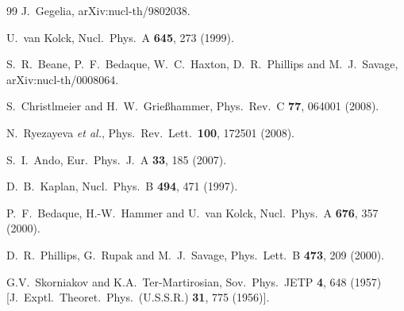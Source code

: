 \documentclass[aps,rmp,nofootinbib,twocolumn,floatfix]{revtex4}
\begin{document}
\begin{thebibliography}{99}
  J.~Gegelia,
  arXiv:nucl-th/9802038.

  U.~van Kolck,
  Nucl.\ Phys.\  A {\bf 645}, 273 (1999).


  S.~R.~Beane, P.~F.~Bedaque, W.~C.~Haxton, D.~R.~Phillips and M.~J.~Savage,
  arXiv:nucl-th/0008064.


  S.~Christlmeier and H.~W.~Grie{\ss}hammer,
  Phys.\ Rev.\  C {\bf 77}, 064001 (2008).

  N.~Ryezayeva {\it et al.},
  Phys.\ Rev.\ Lett.\  {\bf 100}, 172501 (2008).

  S.~I.~Ando,
  Eur.\ Phys.\ J.\  A {\bf 33}, 185 (2007).


  D.~B.~Kaplan,
  Nucl.\ Phys.\  B {\bf 494}, 471 (1997).


  P.~F.~Bedaque, H.-W.~Hammer and U.~van Kolck,
  Nucl.\ Phys.\  A {\bf 676}, 357 (2000).

  D.~R.~Phillips, G.~Rupak and M.~J.~Savage,
  Phys.\ Lett.\  B {\bf 473}, 209 (2000).

G.V.~Skorniakov and K.A.~Ter-Martirosian,
Sov.\ Phys.\ JETP {\bf 4}, 648 (1957) 
        [J.\ Exptl.\ Theoret.\ Phys.\ (U.S.S.R.) {\bf 31}, 775 (1956)].


\end{thebibliography}
\end{document}
